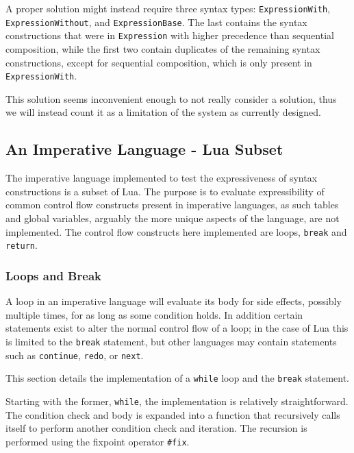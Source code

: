 \documentclass{kththesis}
\begin{document}
A proper solution might instead require three syntax types: \texttt{ExpressionWith}, \texttt{ExpressionWithout}, and \texttt{ExpressionBase}. The last contains the syntax constructions that were in \texttt{Expression} with higher precedence than sequential composition, while the first two contain duplicates of the remaining syntax constructions, except for sequential composition, which is only present in \texttt{ExpressionWith}.

This solution seems inconvenient enough to not really consider a solution, thus we will instead count it as a limitation of the system as currently designed.

\subsection{An Imperative Language - Lua Subset} \label{sec:imperative-eval}

The imperative language implemented to test the expressiveness of syntax constructions is a subset of Lua. %
The purpose is to evaluate expressibility of common control flow constructs present in imperative languages, as such tables and global variables, arguably the more unique aspects of the language, are not implemented. The control flow constructs here implemented are loops, \texttt{break} and \texttt{return}.

\subsubsection{Loops and Break} \label{sec:lua-loops-and-break}

A loop in an imperative language will evaluate its body for side effects, possibly multiple times, for as long as some condition holds. In addition certain statements exist to alter the normal control flow of a loop; in the case of Lua this is limited to the \texttt{break} statement, but other languages may contain statements such as \texttt{continue}, \texttt{redo}, or \texttt{next}.

This section details the implementation of a \texttt{while} loop and the \texttt{break} statement.

Starting with the former, \texttt{while}, the implementation is relatively straightforward. The condition check and body is expanded into a function that recursively calls itself to perform another condition check and iteration. The recursion is performed using the fixpoint operator \texttt{#fix}.
\end{document}
